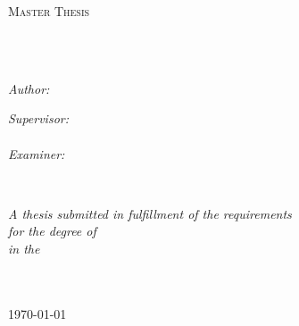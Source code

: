 \documentclass[
11pt, %
english, %
onehalfspacing, %
nolistspacing, %
parskip, %
headsepline, %
]{MastersDoctoralThesis} %
\author{Bosse \textsc{Sottmann}} %
\begin{document}
\frontmatter %

\pagestyle{plain} %


\begin{titlepage}
\begin{center}

\vspace*{.06\textheight}
{\scshape\LARGE \univname\par}\vspace{1.5cm} %
\textsc{\Large Master Thesis}\\[0.5cm] %

\HRule \\[0.4cm] %
{\huge \bfseries \ttitle\par}\vspace{0.4cm} %
\HRule \\[1.5cm] %
 
\begin{minipage}[t]{0.4\textwidth}
\begin{flushleft} \large
\emph{Author:}\\
{\authorname}
\end{flushleft}
\end{minipage}
\begin{minipage}[t]{0.4\textwidth}
\begin{flushright} \large
\emph{Supervisor:} \\
{\supname}\\
\vspace{0.5cm}
\emph{Examiner:}\\
{\examname}
\end{flushright}
\end{minipage}\\[3cm]
 
\vfill

\large \textit{A thesis submitted in fulfillment of the requirements\\ for the degree of \degreename}\\[0.3cm] %
\textit{in the}\\[0.4cm]
\deptname\\\facname\\[2cm] %
 
\vfill

{\large \today}\\[4cm] %
 
\vfill
\end{center}
\end{titlepage}
\end{document}
